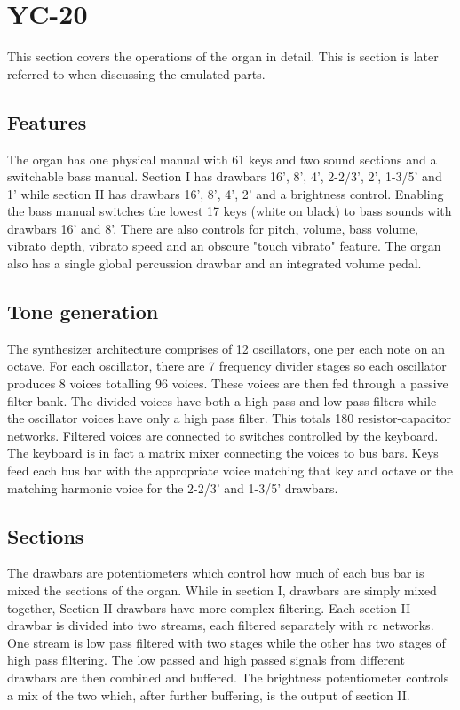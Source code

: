 \documentclass[11pt,a4paper]{article}
\begin{document}
\section{YC-20}
\label{section:yc-20}

This section covers the operations of the organ in detail\cite{yamaha:yc20}. This is section is later referred to when discussing the emulated parts.

\subsection{Features}

The organ has one physical manual with 61 keys and two sound sections and a switchable bass manual. Section I has drawbars 16', 8', 4', 2-2/3', 2', 1-3/5' and 1' while section II has drawbars 16', 8', 4', 2' and a brightness control. Enabling the bass manual switches the lowest 17 keys (white on black) to bass sounds with drawbars 16' and 8'. There are also controls for pitch, volume, bass volume, vibrato depth, vibrato speed and an obscure "touch vibrato" feature. The organ also has a single global percussion drawbar and an integrated volume pedal.

\subsection{Tone generation}

The synthesizer architecture comprises of 12 oscillators, one per each note on an octave. For each oscillator, there are 7 frequency divider stages so each oscillator produces 8 voices totalling 96 voices. These voices are then fed through a passive filter bank. The divided voices have both a high pass and low pass filters while the oscillator voices have only a high pass filter. This totals 180 resistor-capacitor networks. Filtered voices are connected to switches controlled by the keyboard. The keyboard is in fact a matrix mixer connecting the voices to bus bars. Keys feed each bus bar with the appropriate voice matching that key and octave or the matching harmonic voice for the 2-2/3' and 1-3/5' drawbars. 

\subsection{Sections}

The drawbars are potentiometers which control how much of each bus bar is mixed the sections of the organ. While in section I, drawbars are simply mixed together, Section II drawbars have more complex filtering. Each section II drawbar is divided into two streams, each filtered separately with rc networks. One stream is low pass filtered with two stages while the other has two stages of high pass filtering. The low passed and high passed signals from different drawbars are then combined and buffered. The brightness potentiometer controls a mix of the two which, after further buffering, is the output of section II. 
\end{document}
